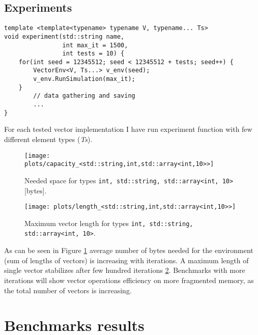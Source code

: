 \documentclass[inz, english, shortabstract]{iithesis}
\begin{document}
\section {Experiments}
\begin{lstlisting}[caption=experiment function]
template <template<typename> typename V, typename... Ts>
void experiment(std::string name, 
				int max_it = 1500, 
				int tests = 10) {
	for(int seed = 12345512; seed < 12345512 + tests; seed++) {
		VectorEnv<V, Ts...> v_env(seed);
		v_env.RunSimulation(max_it);
	}
		// data gathering and saving
		...
}
\end{lstlisting}
For each tested vector implementation I have run experiment function with few different element types ({\it Ts}). 

\begin{figure}[h!]
\texttt{[image: plots/capacity\_<std::string,int,std::array<int,10>>]}
\caption{Needed space for types \lstinline{int, std::string, std::array<int, 10>} [bytes].}
\label{space_consumption}
\end{figure}

\begin{figure}[h!]
\texttt{[image: plots/length\_<std::string,int,std::array<int,10>>]}
\caption{Maximum vector length for types \lstinline{int, std::string, std::array<int, 10>}.}
\label{vector_length}
\end{figure}


As can be seen in Figure \ref{space_consumption} average number of bytes needed for the environment (sum of lengths of vectors) is increasing with iterations. A maximum length of single vector stabilizes after few hundred iterations \ref{vector_length}. Benchmarks with more iterations will show vector operations efficiency on more fragmented memory, as the total number of vectors is increasing.

\chapter{Benchmarks results}
\end{document}
